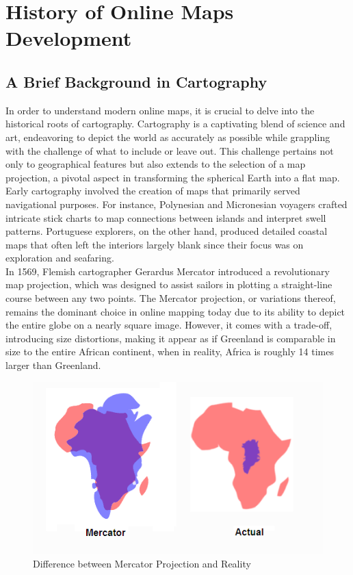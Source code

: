 \documentclass[10pt,oneside,english,a4paper]{article}
\begin{document}
\section{History of Online Maps Development} \label{history}

\subsection{A Brief Background in Cartography} \label{history:brief}
In order to understand modern online maps, it is crucial to delve into the historical roots of cartography. Cartography is a captivating blend of science and art, endeavoring to depict the world as accurately as possible while grappling with the challenge of what to include or leave out. This challenge pertains not only to geographical features but also extends to the selection of a map projection, a pivotal aspect in transforming the spherical Earth into a flat map.
\\Early cartography involved the creation of maps that primarily served navigational purposes. For instance, Polynesian and Micronesian voyagers crafted intricate stick charts to map connections between islands and interpret swell patterns. Portuguese explorers, on the other hand, produced detailed coastal maps that often left the interiors largely blank since their focus was on exploration and seafaring.
\\In 1569, Flemish cartographer Gerardus Mercator introduced a revolutionary map projection\cite{Forrest2021}, which was designed to assist sailors in plotting a straight-line course between any two points. The Mercator projection, or variations thereof, remains the dominant choice in online mapping today due to its ability to depict the entire globe on a nearly square image. However, it comes with a trade-off, introducing size distortions, making it appear as if Greenland is comparable in size to the entire African continent, when in reality, Africa is roughly 14 times larger than Greenland.

\begin{figure}[h]
	\centering
	\includegraphics[scale=0.5]{diagram4.png}
	\caption{Difference between Mercator Projection and Reality}
	\label{fig:mercator}
\end{figure}
\end{document}
